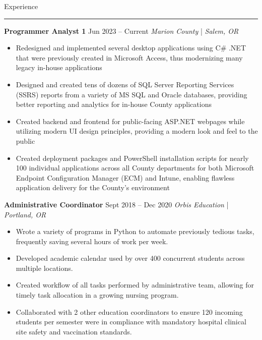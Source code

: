\documentclass[11pt]{article}
\newcommand{\sectiontitle}[1]{
    \noindent\Large#1
    \newline
    \vspace{-0.18in}
    \hrule   
}
\newcommand{\occupation}[4]{
    \topitemspacing
    \normalsize
    \noindent\textbf{#1}
    \hfill
    \noindent#3
    \newline
    \noindent\textit{#2} | \textit{#4}
    \toplistspacing
}
\newcommand{\sectionendspace}{
    \vspace{0.1in}
}
\newcommand{\toplistspacing}{
    \vspace{0.04in}
}
\newcommand{\topitemspacing}{
    \vspace{0.1in}
}
\begin{document}
    \sectionendspace
    \sectiontitle{Experience}
    \occupation{Programmer Analyst 1}{Marion County}
    {Jun 2023 -- Current}
    {Salem, OR}
    \begin{itemize}[noitemsep,nolistsep]
        \item Redesigned and implemented several desktop applications using C\# .NET that were previously created in Microsoft Access, thus modernizing many legacy in-house applications
        \item Designed and created tens of dozens of SQL Server Reporting Services (SSRS) reports from a variety of MS SQL and Oracle databases, providing better reporting and analytics for in-house County applications
        \item Created backend and frontend for public-facing ASP.NET webpages while utilizing modern UI design principles, providing a modern look and feel to the public
        \item Created deployment packages and PowerShell installation scripts for nearly 100 individual applications across all County departments for both Microsoft Endpoint Configuration Manager (ECM) and Intune, enabling flawless application delivery for the County's environment
    \end{itemize}
    \occupation{Administrative Coordinator}{Orbis Education}
    {Sept 2018 -- Dec 2020}
    {Portland, OR}
    \begin{itemize}[noitemsep,nolistsep]
        \item Wrote a variety of programs in Python to automate previously tedious tasks, frequently saving several hours of work per week.
        \item Developed academic calendar used by over 400 concurrent students across multiple locations.
        \item Created workflow of all tasks performed by administrative team, allowing for timely task allocation in a growing nursing program.
        \item Collaborated with 2 other education coordinators to ensure 120 incoming students per semester were in compliance with mandatory hospital clinical site safety and vaccination standards.
    \end{itemize}
\end{document}

